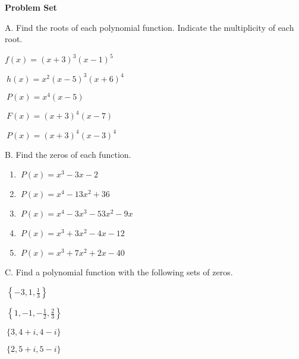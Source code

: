 \textbf{Problem Set}

\vspce

A. Find the roots of each polynomial function. Indicate the multiplicity of each root.  
\begin{enumerate}[label = \arabic*. ]
\begin{multicols}{2}

\item \hspce ${f(x) = (x+3)^3(x-1)^5} $
\vspce
\item \hspce $\ {h(x) = x^2(x-5)^3(x+6)^4}$
\vspce
\item \hspce $\ {P(x) = x^4(x-5)}$
\vspce
\item \hspce $\ {F(x) = (x+3)^4(x-7)}$
\vspce
\item \hspce $\ {P(x) = (x+3)^4(x-3)^4}$
\end{multicols}
\end{enumerate}


B. Find the zeros of each function. 

\begin{enumerate}[label = \arabic*. ]

\item \hspce $\ {P(x) = x^3-3x-2}$
\vspce
\item \hspce $\ {P(x) = x^4-13x^2+36}$
\vspce
\item \hspce $\ {P(x) = x^4-3x^3-53x^2-9x}$
\vspce
\item \hspce $\ {P(x) = x^3+3x^2-4x-12}$
\vspce
\item \hspce $\ {P(x) = x^3+7x^2+2x-40}$

\end{enumerate}  
 

C. Find a polynomial function with the following sets of zeros. 

\begin{enumerate}[label = \arabic*. ]
\begin{multicols}{2}


\item \hspce $\ { \left\{-3, 1, \displaystyle \frac{1}{3} \right\} }$ 
\vspce 
\item \hspce $\ { \left\{1, -1, \displaystyle  -\frac{1}{2}, \displaystyle  \frac{2}{3} \right\} }$ 
\vspce 
\item \hspce $\ {\{3, 4+i, 4-i \} }$ 
\vspce 
\item \hspce $\ {\{2, 5+i, 5-i \} }$ 
\end{multicols} 
\end{enumerate}  

